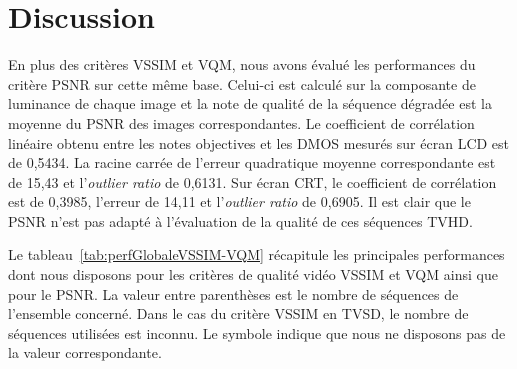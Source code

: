 \section{Discussion}
En plus des critères VSSIM et VQM, nous avons évalué les performances du critère PSNR sur cette même base. Celui-ci est calculé sur la composante de luminance de chaque image et la note de qualité de la séquence dégradée est la moyenne du PSNR des images correspondantes. Le coefficient de corrélation linéaire obtenu entre les notes objectives et les DMOS mesurés sur écran LCD est de 0,5434. La racine carrée de l'erreur quadratique moyenne correspondante est de 15,43 et l'\emph{outlier ratio} de 0,6131. Sur écran CRT, le coefficient de corrélation est de 0,3985, l'erreur de 14,11 et l'\emph{outlier ratio} de 0,6905. Il est clair que le PSNR n'est pas adapté à l'évaluation de la qualité de ces séquences TVHD.

Le tableau~\ref{tab:perfGlobaleVSSIM-VQM} récapitule les principales performances dont nous disposons pour les critères de qualité vidéo VSSIM et VQM ainsi que pour le PSNR. La valeur entre parenthèses est le nombre de séquences de l'ensemble concerné. Dans le cas du critère VSSIM en TVSD, le nombre de séquences utilisées est inconnu. Le symbole \texttimes{} indique que nous ne disposons pas de la valeur correspondante.


